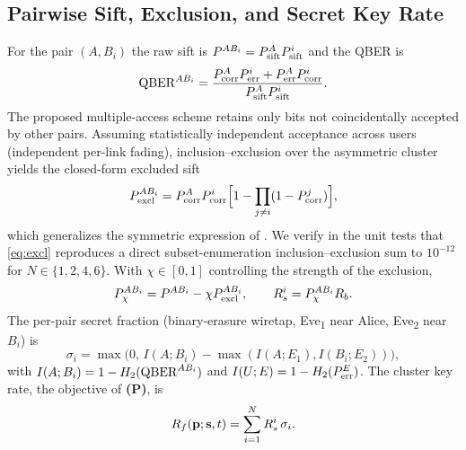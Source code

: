 \subsection{Pairwise Sift, Exclusion, and Secret Key Rate}\label{sec:system:pair}

For the pair $(A,B_i)$ the raw sift is $P^{AB_i} = P_{\mathrm{sift}}^A P_{\mathrm{sift}}^i$ and the QBER is
\begin{equation}
  \mathrm{QBER}^{AB_i} = \frac{P_{\mathrm{corr}}^A P_{\mathrm{err}}^i + P_{\mathrm{err}}^A P_{\mathrm{corr}}^i}{P_{\mathrm{sift}}^A P_{\mathrm{sift}}^i}.\label{eq:qber_pair}
\end{equation}
The proposed multiple-access scheme retains only bits not coincidentally accepted by other pairs. Assuming statistically independent acceptance across users (independent per-link fading), inclusion--exclusion over the asymmetric cluster yields the closed-form excluded sift
\begin{equation}
  P^{AB_i}_{\mathrm{excl}} = P_{\mathrm{corr}}^A P_{\mathrm{corr}}^i\Big[1 - \prod_{j\neq i}(1 - P_{\mathrm{corr}}^j)\Big],\label{eq:excl}
\end{equation}
which generalizes the symmetric expression of \cite[Eq.~22]{vu2023photonics}. We verify in the unit tests that \eqref{eq:excl} reproduces a direct subset-enumeration inclusion--exclusion sum to $10^{-12}$ for $N\in\{1,2,4,6\}$. With $\chi\in[0,1]$ controlling the strength of the exclusion,
\begin{equation}
  P^{AB_i}_\chi = P^{AB_i} - \chi P^{AB_i}_{\mathrm{excl}},\qquad R_s^i = P^{AB_i}_\chi R_b.
\end{equation}
The per-pair secret fraction (binary-erasure wiretap, Eve\textsubscript{1} near Alice, Eve\textsubscript{2} near $B_i$) is
\begin{equation}
  \sigma_i = \max\!\big(0,\, I(A;B_i) - \max(I(A;E_1), I(B_i;E_2))\big),\label{eq:sigma}
\end{equation}
with $I(A;B_i) = 1 - H_2(\mathrm{QBER}^{AB_i})$ and $I(U;E) = 1 - H_2(P_{\mathrm{err}}^E)$. The cluster key rate, the objective of \textbf{(P)}, is
\begin{equation}
  R_f(\mathbf{p};\mathbf{s},t) = \sum_{i=1}^N R_s^i\,\sigma_i.\label{eq:Rf}
\end{equation}

